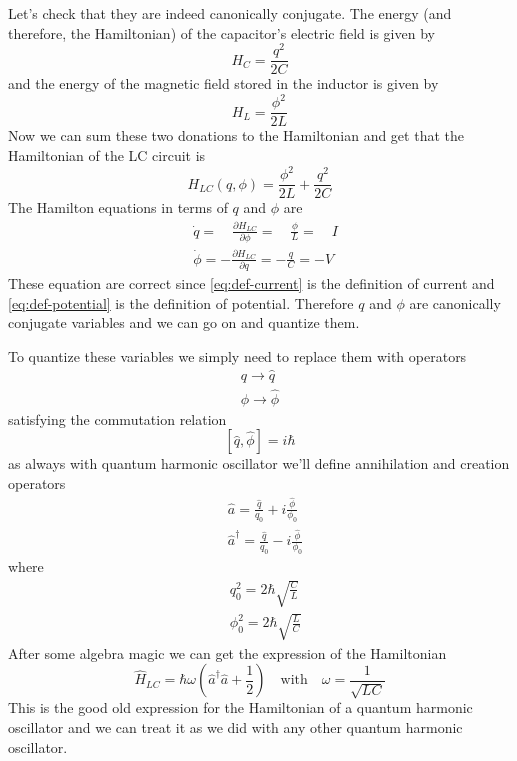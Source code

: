 Let's check that they are indeed canonically conjugate. The energy (and therefore, the Hamiltonian) of the capacitor's electric field is given by
\[
    H_C = \frac{q^2}{2C}
\]
and the energy of the magnetic field stored in the inductor is given by
\[
    H_L = \frac{\phi^2}{2L}
\]
Now we can sum these two donations to the Hamiltonian and get that the Hamiltonian of the LC circuit is
\[
    H_{LC}(q, \phi) = \frac{\phi^2}{2L} + \frac{q^2}{2C}
\]
The Hamilton equations in terms of $q$ and $\phi$ are
\begin{align}
    &\dot{q} = \quad \frac{\partial H_{LC}}{\partial \phi} = \quad \frac{\phi}{L} = \quad I \label{eq:def-current}\\
    &\dot{\phi} = -\frac{\partial H_{LC}}{\partial q} = -\frac{q}{C} = -V \label{eq:def-potential}
\end{align}
These equation are correct since \ref{eq:def-current} is the definition of current and \ref{eq:def-potential} is the definition of potential. Therefore $q$ and $\phi$ are canonically conjugate variables and we can go on and quantize them.

To quantize these variables we simply need to replace them with operators
\begin{align*}
    q \rightarrow \hat{q} \\
    \phi \rightarrow \hat{\phi}
\end{align*}
satisfying the commutation relation
\[
    [\hat{q}, \hat{\phi}] = i\hbar
\]
as always with quantum harmonic oscillator we'll define annihilation and creation operators
\begin{align*}
    &\hat{a} = \frac{\hat{q}}{q_0} + i\frac{\hat{\phi}}{\phi_0} \\
    &\hat{a}^\dag = \frac{\hat{q}}{q_0} - i\frac{\hat{\phi}}{\phi_0}
\end{align*}
where
\begin{align*}
    &q_0^2 = 2\hbar\sqrt{\frac{C}{L}} \\
    &\phi_0^2 = 2\hbar\sqrt{\frac{L}{C}}
\end{align*}
After some algebra magic we can get the expression of the Hamiltonian
\[
    \hat{H}_{LC} = \hbar \omega (\hat{a}^\dag \hat{a} + \frac{1}{2}) \quad \text{with} \quad \omega = \frac{1}{\sqrt{LC}}
\]
This is the good old expression for the Hamiltonian of a quantum harmonic oscillator and we can treat it as we did with any other quantum harmonic oscillator.

